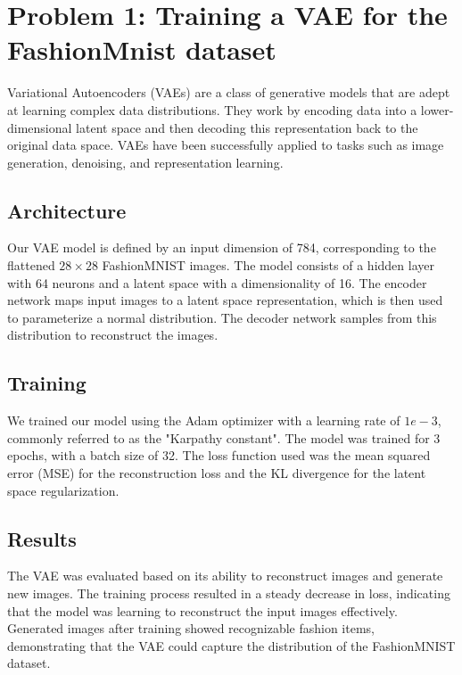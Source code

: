 \documentclass[12pt]{scrartcl}
\begin{document}
    \section{Problem 1: Training a VAE for the FashionMnist dataset}

    Variational Autoencoders (VAEs) are a class of generative models that are adept at learning complex data distributions. They work by encoding data into a lower-dimensional latent space and then decoding this representation back to the original data space. VAEs have been successfully applied to tasks such as image generation, denoising, and representation learning.

    \subsection{Architecture}

    Our VAE model is defined by an input dimension of 784, corresponding to the flattened \(28\times28\) FashionMNIST images. The model consists of a hidden layer with 64 neurons and a latent space with a dimensionality of 16. The encoder network maps input images to a latent space representation, which is then used to parameterize a normal distribution. The decoder network samples from this distribution to reconstruct the images.

    \subsection{Training}

    We trained our model using the Adam optimizer with a learning rate of \(1e-3\), commonly referred to as the "Karpathy constant". The model was trained for 3 epochs, with a batch size of 32. The loss function used was the mean squared error (MSE) for the reconstruction loss and the KL divergence for the latent space regularization.

    \subsection{Results}

    The VAE was evaluated based on its ability to reconstruct images and generate new images. The training process resulted in a steady decrease in loss, indicating that the model was learning to reconstruct the input images effectively. Generated images after training showed recognizable fashion items, demonstrating that the VAE could capture the distribution of the FashionMNIST dataset.
\end{document}
